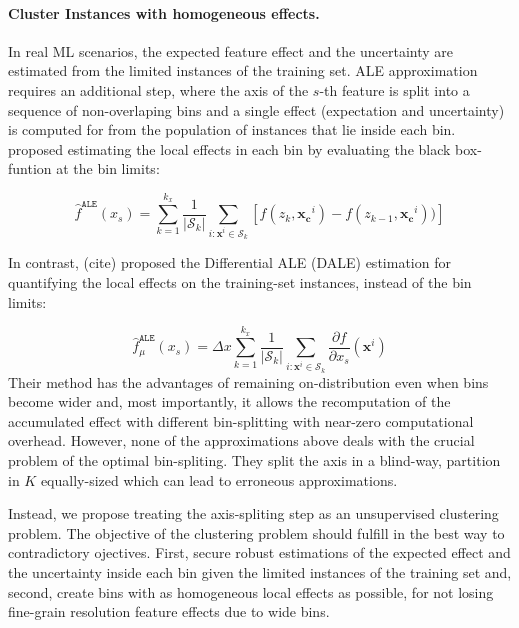 \documentclass[twoside]{article}
\newcommand{\xc}{\mathbf{x_c}}
\begin{document}
\paragraph{Cluster Instances with homogeneous effects.}

In real ML scenarios, the expected feature effect and the uncertainty
are estimated from the limited instances of the training set. ALE
approximation requires an additional step, where the axis of the
\(s\)-th feature is split into a sequence of non-overlaping bins and a
single effect (expectation and uncertainty) is computed for from the
population of instances that lie inside each
bin. \citep{apley2020visualizing} proposed estimating the local
effects in each bin by evaluating the black box-funtion at the bin
limits:

\begin{equation}
  \label{eq:ALE_accumulated_mean_est}
  \hat{f}^{\mathtt{ALE}}(x_s) = \sum_{k=1}^{k_x} \frac{1}{|\mathcal{S}_k|} \sum_{i:\mathbf{x}^i \in
    \mathcal{S}_k} \left [ f(z_{k}, \xc^i) - f(z_{k-1}, \xc^i)) \right ]
\end{equation}

In contrast, (cite) proposed the Differential ALE (DALE) estimation
for quantifying the local effects on the training-set instances,
instead of the bin limits:

\begin{equation}
  \label{eq:DALE_accumulated_mean_est}
  \hat{f}^{\mathtt{ALE}}_{\mu}(x_s) = \Delta x \sum_{k=1}^{k_x} \frac{1}{|\mathcal{S}_k|} \sum_{i:\mathbf{x}^i \in
    \mathcal{S}_k} \frac{\partial f}{\partial x_s}(\mathbf{x}^i)
\end{equation}
%
Their method has the advantages of remaining on-distribution even when
bins become wider and, most importantly, it allows the recomputation
of the accumulated effect with different bin-splitting with near-zero
computational overhead. However, none of the approximations above
deals with the crucial problem of the optimal bin-spliting. They split
the axis in a blind-way, partition in \(K\) equally-sized which can
lead to erroneous approximations.

Instead, we propose treating the axis-spliting step as an unsupervised
clustering problem. The objective of the clustering problem should
fulfill in the best way to contradictory ojectives. First, secure
robust estimations of the expected effect and the uncertainty inside
each bin given the limited instances of the training set and, second,
create bins with as homogeneous local effects as possible, for not
losing fine-grain resolution feature effects due to wide bins.
\end{document}
